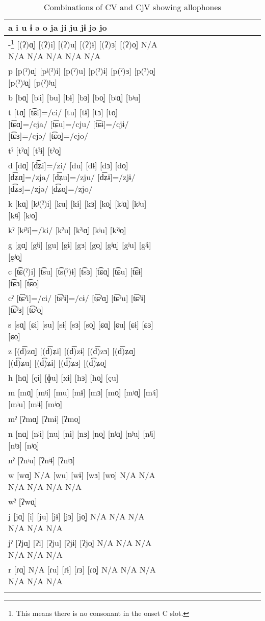 \begin{sidewaystable}
\caption{Combinations of CV and CjV showing allophones}
\begin{tabular}{ *{13}{l} } 
\lsptoprule
 a  i  u  ɨ  ə  o  ja  ji  ju  jɨ  jə  jo\\\midrule
{}-\footnote{This means there is no consonant in the onset C slot.}  [(ʔ)ɑ̟]  [(ʔ)i]  [(ʔ)u]  [(ʔ)ɨ]  [(ʔ)ɜ]  [(ʔ)o̞]  N/A  N/A  N/A  N/A  N/A  N/A\\
p  [p(ˀ)ɑ̟]  [pʲ(ˀ)i]  [p(ˀ)u]  [p(ˀ)ɨ]  [p(ˀ)ɜ]  [p(ˀ)o̞]  [p(ˀ)ʲɑ̟]    [p(ˀ)ʲu]      \\
b  [bɑ̟]  [bʲi]  [bu]  [bɨ]  [bɜ]  [bo̞]  [bʲɑ̟]    [bʲu]      \\
t  [tɑ̟]  [t͡ɕi]=/ci/  [tu]  [tɨ]  [tɜ]  [to̞]  [t͡ɕɑ̟]=/cja/    [t͡ɕu]=/cju/  [t͡ɕɨ]=/cjɨ/  [t͡ɕɜ]=/cjə/  [t͡ɕo̞]=/cjo/\\
tˀ  [tˀɑ̟]      [tˀɨ]    [tˀo̞]            \\
d  [dɑ̟]  [d͡ʑi]=/zi/  [du]  [dɨ]  [dɜ]  [do̞]  [d͡ʑɑ̟]=/zja/    [d͡ʑu]=/zju/  [d͡ʑɨ]=/zjɨ/  [d͡ʑɜ]=/zjə/  [d͡ʑo̞]=/zjo/\\
k  [kɑ̟]  [kʲ(ˀ)i]  [ku]  [kɨ]  [kɜ]  [ko̞]  [kʲɑ̟]    [kʲu]  [kʲɨ]    [kʲo̞]\\
kˀ    [kʲˀi]=/ki/  [kˀu]        [kˀʲɑ̟]    [kʲu]      [kˀʲo̞]\\
g  [gɑ̟]  [gʲi]  [gu]  [gɨ]  [gɜ]  [go̞]  [gʲɑ̟]    [gʲu]  [gʲɨ]    [gʲo̞]\\
c    [t͡ɕ(ˀ)i]  [t͡su]  [t͡s(ˀ)ɨ]  [t͡sɜ]    [t͡ɕɑ̟]    [t͡ɕu]  [t͡ɕɨ]  [t͡ɕɜ]  [t͡ɕo̞]\\
cˀ    [t͡ɕˀi]=/ci/    { [t͡sˀɨ]=/cɨ/}      [t͡ɕˀɑ̟]    [t͡ɕˀu]  [t͡ɕˀɨ]  [t͡ɕˀɜ]  [t͡ɕˀo̞]\\
s  [sɑ̟]  [ɕi]  [su]  [sɨ]  [sɜ]  [so̞]  [ɕɑ̟]    [ɕu]  [ɕɨ]  [ɕɜ]  [ɕo̞]\\
z  [(d͡)zɑ̟]  [(d͡)ʑi]    [(d͡)zɨ]  [(d͡)zɜ]    [(d͡)ʑɑ̟]    [(d͡)ʑu]  [(d͡)ʑɨ]  [(d͡)ʑɜ]  [(d͡)ʑo̞]\\
h  [hɑ̟]  [çi]  [ɸu]  [xɨ]  [hɜ]  [ho̞]      [çu]      \\
m  [mɑ̟]  [mʲi]  [mu]  [mɨ]  [mɜ]  [mo̞]  [mʲɑ̟]  [mʲi]  [mʲu]  [mʲɨ]    [mʲo̞]\\
mˀ  [ʔmɑ̟]      [ʔmɨ]    [ʔmo̞]            \\
n  [nɑ̟]  [nʲi]  [nu]  [nɨ]  [nɜ]  [no̞]  [nʲɑ̟]    [nʲu]  [nʲɨ]  [nʲɜ]  [nʲo̞]\\
nˀ                  [ʔnʲu]  [ʔnʲɨ]  [ʔnʲɜ]  \\
w  [wɑ̟]  N/A  [wu]  [wɨ]  [wɜ]  [wo̞]  N/A  N/A  N/A  N/A  N/A  N/A\\
wˀ  [ʔwɑ̟]                      \\
j  [jɑ̟]  [i]  [ju]  [jɨ]  [jɜ]  [jo̞]  N/A  N/A  N/A  N/A  N/A  N/A\\
jˀ  [ʔjɑ̟]  [ʔi]  [ʔju]  [ʔjɨ]    [ʔjo̞]  N/A  N/A  N/A  N/A  N/A  N/A\\
r  [ɾɑ̟]  N/A  [ɾu]  [ɾɨ]  [ɾɜ]  [ɾo̞]  N/A  N/A  N/A  N/A  N/A  N/A\\
\lspbottomrule
\end{tabular}
\end{sidewaystable}


